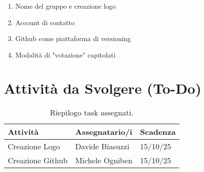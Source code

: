 \documentclass[a4paper, 11pt, oneside]{scrartcl} %
\begin{document}
\begin{enumerate}
    \item Nome del gruppo e creazione logo
    \item Account di contatto
    \item Github come piattaforma di versioning
    \item Modalità di "votazione" capitolati
\end{enumerate}

\newpage
\section{Attività da Svolgere (To-Do)}

\begin{table}[h!]
\centering
\begin{tabular}{@{}lll@{}}
\toprule
\textbf{Attività} & \textbf{Assegnatario/i} & \textbf{Scadenza} \\
\midrule
Creazione Logo & Davide Biasuzzi & 15/10/25 \\
Creazione Github & Michele Ogniben & 15/10/25 \\
\bottomrule
\end{tabular}
\caption{Riepilogo task assegnati.}
\end{table}
\end{document}
